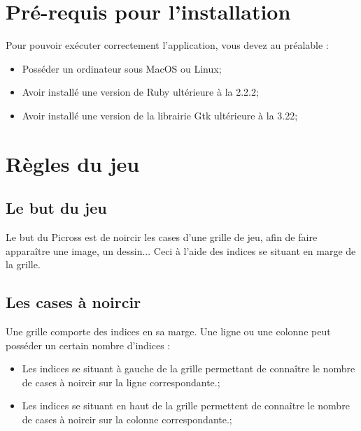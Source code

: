 \documentclass[a4paper, 12pt]{report}
\begin{document}
\begin{titlepage}
\begin{center}
	\end{center}
\end{titlepage}

\renewcommand{\contentsname}{Sommaire}
\tableofcontents
\thispagestyle{empty}
\thispagestyle{plain}



\chapter{Pré-requis pour l'installation}
\thispagestyle{empty}
\thispagestyle{plain}

    Pour pouvoir exécuter correctement l'application, vous devez au préalable :
    \begin{itemize}
        \item Posséder un ordinateur sous MacOS ou Linux;
        \item Avoir installé une version de Ruby ultérieure à la 2.2.2;
        \item Avoir installé une version de la librairie Gtk ultérieure à la 3.22;
    \end{itemize}


\chapter{Règles du jeu}
\thispagestyle{empty}
\thispagestyle{plain}


		\section{Le but du jeu}

            Le but du Picross est de noircir les cases d'une grille de jeu, afin de faire apparaître une image, un dessin... Ceci à l'aide des indices se situant en marge de la grille.

		\section{Les cases à noircir}

            Une grille comporte des indices en sa marge. Une ligne ou une colonne peut posséder un certain nombre d'indices :
            \begin{itemize}
                \item Les indices se situant à gauche de la grille permettant de connaître le nombre de cases à noircir sur la ligne correspondante.;
                \item Les indices se situant en haut de la grille permettent de connaître le nombre de cases à noircir sur la colonne correspondante.;
            \end{itemize}
\end{document}
